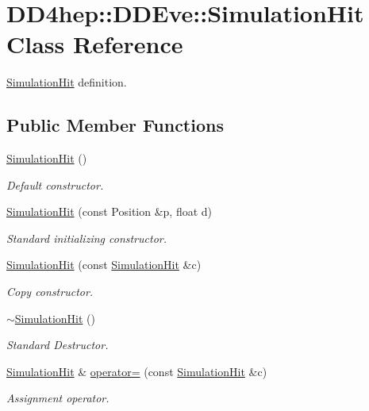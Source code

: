 \hypertarget{class_d_d4hep_1_1_d_d_eve_1_1_simulation_hit}{
\section{DD4hep::DDEve::SimulationHit Class Reference}
\label{class_d_d4hep_1_1_d_d_eve_1_1_simulation_hit}
}


\hyperlink{class_d_d4hep_1_1_d_d_eve_1_1_simulation_hit}{SimulationHit} definition.  
\subsection*{Public Member Functions}
\begin{DoxyCompactItemize}
\item 
\hyperlink{class_d_d4hep_1_1_d_d_eve_1_1_simulation_hit_a52422ccbc4cabcf550a4295a3ae69fac}{SimulationHit} ()
\begin{DoxyCompactList}\small\item\em Default constructor. \item\end{DoxyCompactList}\item 
\hyperlink{class_d_d4hep_1_1_d_d_eve_1_1_simulation_hit_a6374a26cae5bd1a3d4aeca8059872df1}{SimulationHit} (const Position \&p, float d)
\begin{DoxyCompactList}\small\item\em Standard initializing constructor. \item\end{DoxyCompactList}\item 
\hyperlink{class_d_d4hep_1_1_d_d_eve_1_1_simulation_hit_a611310f4056789d4f00b19755f46636b}{SimulationHit} (const \hyperlink{class_d_d4hep_1_1_d_d_eve_1_1_simulation_hit}{SimulationHit} \&c)
\begin{DoxyCompactList}\small\item\em Copy constructor. \item\end{DoxyCompactList}\item 
\hyperlink{class_d_d4hep_1_1_d_d_eve_1_1_simulation_hit_affeb47d7d697a8aa4823c6e839e4a8d6}{$\sim$SimulationHit} ()
\begin{DoxyCompactList}\small\item\em Standard Destructor. \item\end{DoxyCompactList}\item 
\hyperlink{class_d_d4hep_1_1_d_d_eve_1_1_simulation_hit}{SimulationHit} \& \hyperlink{class_d_d4hep_1_1_d_d_eve_1_1_simulation_hit_a12089779b1b39ae8803dec22e1f0271e}{operator=} (const \hyperlink{class_d_d4hep_1_1_d_d_eve_1_1_simulation_hit}{SimulationHit} \&c)
\begin{DoxyCompactList}\small\item\em Assignment operator. \item\end{DoxyCompactList}\end{DoxyCompactItemize}
